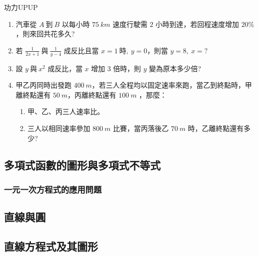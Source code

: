 \documentclass[bwprint,a4paper]{extarticle}
\begin{document}
\begin{customs}{功力UPUP}
	\begin{enumerate}
		\item 汽車從 $A\ \text{到}\ B$ 以每小時 $75\ km$ 速度行駛需 $2$ 小時到達，若回程速度增加 $20\%$，則來回共花多久?
		\item 若 $\frac{1}{2x+1}\ \text{與}\ \frac{1}{y-4}$ 成反比且當 $x=1\ \text{時},\ y=0$，則當 $y=8,\ x=?$
		\item 設 $y\ \text{與}\ x^2$ 成反比，當 $x$ 增加 $3$ 倍時，則 $y$ 變為原本多少倍?
		\item 甲乙丙同時出發跑 $400\ m$，若三人全程均以固定速率來跑，當乙到終點時，甲離終點還有 $50\ m$，丙離終點還有 $100\ m$ ，那麼：
		\begin{enumerate}[label=(\arabic*)]
			\item 甲、乙、丙三人速率比。
			\item 三人以相同速率參加 $800\ m$ 比賽，當丙落後乙 $70\ m$ 時，乙離終點還有多少?
		\end{enumerate}
	\end{enumerate}
\end{customs}
\subsection{多項式函數的圖形與多項式不等式}

\subsubsection{一元一次方程式的應用問題}
\newpage
\begin{center}
	\section{直線與圓}
\end{center}

\subsection{直線方程式及其圖形}
\end{document}
